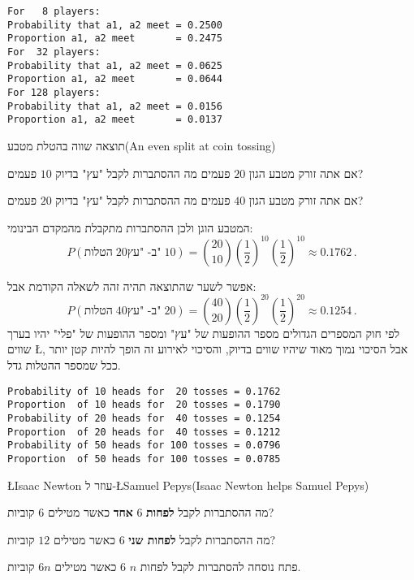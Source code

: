 \sml{}
\begin{verbatim}
For   8 players:
Probability that a1, a2 meet = 0.2500
Proportion a1, a2 meet       = 0.2475
For  32 players:
Probability that a1, a2 meet = 0.0625
Proportion a1, a2 meet       = 0.0644
For 128 players:
Probability that a1, a2 meet = 0.0156
Proportion a1, a2 meet       = 0.0137
\end{verbatim}


\begin{prob}{תוצאה שווה בהטלת מטבע}{}{(An even split at coin tossing)}

אם אתה זורק מטבע הגון 
$20$
פעמים מה ההסתברות לקבל "עץ" בדיוק 
$10$
פעמים?

אם אתה זורק מטבע הגון 
$40$
פעמים מה ההסתברות לקבל "עץ" בדיוק 
$20$
פעמים?
\end{prob}

\solution{}

המטבע הוגן ולכן ההסתברות מתקבלת מהמקדם הבינומי:
\[
P(\textrm{הטלות}\; 20\textrm{ב- "עץ"}\;10)=
{20 \choose 10} \left(\frac{1}{2}\right)^{10}\left(\frac{1}{2}\right)^{10}\approx 0.1762\,.
\]

אפשר לשער שהתוצאה תהיה זהה לשאלה הקודמת אבל:
\[
P(\textrm{הטלות}\;40\textrm{ב- "עץ"}\;20)=
{40 \choose 20} \left(\frac{1}{2}\right)^{20}\left(\frac{1}{2}\right)^{20}\approx 0.1254\,.
\]
לפי חוק המספרים הגדולים מספר ההופעות של "עץ" ומספר ההופעות של "פלי" יהיו בערך שווים
\L{\cite[Section~8.4]{ross}},
אבל הסיכוי נמוך מאוד שיהיו שווים בדיוק, והסיכוי לאירוע זה הופך להיות קטן יותר ככל שמספר ההטלות גדל.

\sml{}
\begin{verbatim}
Probability of 10 heads for  20 tosses = 0.1762
Proportion  of 10 heads for  20 tosses = 0.1790
Probability of 20 heads for  40 tosses = 0.1254
Proportion  of 20 heads for  40 tosses = 0.1212
Probability of 50 heads for 100 tosses = 0.0796
Proportion  of 50 heads for 100 tosses = 0.0785
\end{verbatim}


\begin{prob}{\L{\small Isaac Newton} עוזר ל-\L{\small Samuel Pepys}}{}{(Isaac Newton helps Samuel Pepys)}

מה ההסתברות לקבל
\textbf{לפחות}
$6$
\textbf{אחד}
כאשר מטילים 
$6$
קוביות?

מה ההסתברות לקבל
\textbf{לפחות שני}
$6$
כאשר מטילים 
$12$
קוביות?

פתח נוסחה להסתברות לקבל לפחות
$n$ $6$
כאשר מטילים 
$6n$
קוביות.
\end{prob}


